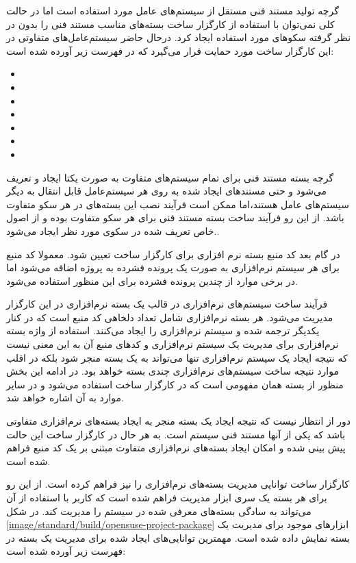گرچه تولید مستند فنی مستقل از سیستم‌های عامل مورد استفاده است اما در حالت کلی
نمی‌توان با استفاده از کارگزار ساخت بسته‌های مناسب مستند فنی را بدون در نظر
گرفته سکوهای مورد استفاده ایجاد کرد. درحال حاضر سیستم‌عامل‌های متفاوتی در این
کارگزار ساخت مورد حمایت قرار می‌گیرد که در فهرست زیر آورده شده است:

\begin{itemize}
  \item {}
  \item {}
  \item {}
  \item {}
  \item {}
  \item {}
  \item {}
\end{itemize}

گرچه بسته مستند فنی برای تمام سیستم‌های متفاوت به صورت یکتا ایجاد و تعریف می‌شود
و حتی مستند‌های ایجاد شده به روی هر سیستم‌عامل قابل انتقال به دیگر سیستم‌های
عامل هستند،اما ممکن است فرآیند نصب این بسته‌های در هر سکو متفاوت باشد.
از این رو فرآیند ساخت بسته مستند فنی برای هر سکو متفاوت بوده و از اصول خاص
تعریف شده در سکوی مورد نظر ایجاد می‌شود..

در گام بعد کد منبع بسته نرم افزاری برای کارگزار ساخت تعیین شود. معمولا کد منبع
برای هر سیستم نرم‌افزاری به صورت یک پرونده فشرده به پروژه اضافه می‌شود اما در
برخی موارد از چندین پرونده فشرده برای این منظور استفاده می‌شود.

فرآیند ساخت سیستم‌های نرم‌افزاری در قالب یک بسته نرم‌افزاری در این کارگزار
مدیریت می‌شود. هر بسته نرم‌افزاری شامل تعداد دلخاهی کد منبع است که در کنار
یکدیگر ترجمه شده و سیستم نرم‌افزاری را ایجاد می‌کنند. استفاده از واژه بسته
نرم‌افزاری برای مدیریت یک سیستم نرم‌افزاری و کدهای منبع آن به این معنی نیست که
نتیجه ایجاد یک سیستم نرم‌افزاری تنها می‌تواند به یک بسته منجر شود بلکه در اقلب
موارد نتیجه ساخت سیستم‌های نرم‌افزاری چندی بسته خواهد بود. در ادامه این بخش
منظور از بسته همان مفهومی است که در کارگزار ساخت استفاده می‌شود و در سایر موارد
به آن اشاره خواهد شد.

دور از انتظار نیست که نتیجه ایجاد یک بسته منجر به ایجاد بسته‌های نرم‌افزاری
متفاوتی باشد که یکی از آنها مستند فنی سیستم است. به هر حال در کارگزار ساخت این
حالت پیش بینی شده و امکان ایجاد بسته‌های نرم‌افزاری متفاوت مبتنی بر یک کد منبع
فراهم شده است.

کارگزار ساخت توانایی مدیریت بسته‌های نرم‌افزاری را نیز فراهم کرده است. از این رو
برای هر بسته یک سری ابزار مدیریت فراهم شده است که کاربر با استفاده از آن
می‌تواند به سادگی بسته‌های معرفی شده در سیستم را مدیریت کند. در شکل 
\ref{image/standard/build/opensuse-project-package} ابزارهای موجود برای مدیریت
یک بسته نمایش داده شده است. مهمترین توانایی‌های ایجاد شده برای مدیریت یک بسته در
فهرست زیر آورده شده است:

